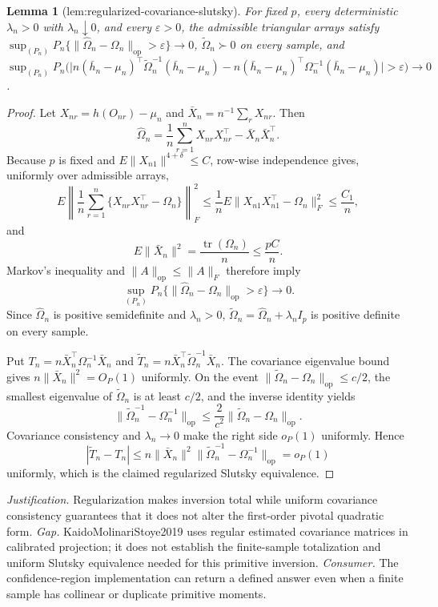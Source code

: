 \documentclass{article}
\newtheorem{lemma}{Lemma}
\begin{document}
\begin{lemma}[lem:regularized-covariance-slutsky]\label{lem:regularized-covariance-slutsky}
For fixed \(p\), every deterministic \(\lambda_n>0\) with \(\lambda_n\downarrow0\), and every \(\varepsilon>0\), the admissible triangular arrays satisfy \(\sup_{(P_n)}P_n\{\|\widehat\Omega_n-\Omega_n\|_{\mathrm{op}}>\varepsilon\}\to0\), \(\widetilde\Omega_n\succ0\) on every sample, and \(\sup_{(P_n)}P_n\bigl(\bigl|n(\bar h_n-\mu_n)^\top\widetilde\Omega_n^{-1}(\bar h_n-\mu_n)-n(\bar h_n-\mu_n)^\top\Omega_n^{-1}(\bar h_n-\mu_n)\bigr|>\varepsilon\bigr)\to0\).
\end{lemma}
\begin{proof}
Let \(X_{nr}=h(O_{nr})-\mu_n\) and \(\bar X_n=n^{-1}\sum_rX_{nr}\).  Then
\[
 \widehat\Omega_n=\frac1n\sum_{r=1}^nX_{nr}X_{nr}^\top-\bar X_n\bar X_n^\top.
\]
Because \(p\) is fixed and \(E\|X_{n1}\|^{4+\delta}\le C\), row-wise independence gives, uniformly over admissible arrays,
\[
 E\left\|\frac1n\sum_{r=1}^n
   \{X_{nr}X_{nr}^\top-\Omega_n\}\right\|_F^2
 \le \frac1n E\|X_{n1}X_{n1}^\top-\Omega_n\|_F^2
 \le\frac{C_1}{n},
\]
and
\[
 E\|\bar X_n\|^2=\frac{\operatorname{tr}(\Omega_n)}n\le\frac{pC}{n}.
\]
Markov's inequality and \(\|A\|_{\mathrm{op}}\le\|A\|_F\) therefore imply
\[
 \sup_{(P_n)}P_n\{\|\widehat\Omega_n-\Omega_n\|_{\mathrm{op}}>\varepsilon\}\longrightarrow0.
\]
Since \(\widehat\Omega_n\) is positive semidefinite and \(\lambda_n>0\), \(\widetilde\Omega_n=\widehat\Omega_n+\lambda_nI_p\) is positive definite on every sample.

Put \(T_n=n\bar X_n^\top\Omega_n^{-1}\bar X_n\) and \(\widetilde T_n=n\bar X_n^\top\widetilde\Omega_n^{-1}\bar X_n\).  The covariance eigenvalue bound gives \(n\|\bar X_n\|^2=O_P(1)\) uniformly.  On the event \(\|\widetilde\Omega_n-\Omega_n\|_{\mathrm{op}}\le c/2\), the smallest eigenvalue of \(\widetilde\Omega_n\) is at least \(c/2\), and the inverse identity yields
\[
 \|\widetilde\Omega_n^{-1}-\Omega_n^{-1}\|_{\mathrm{op}}
 \le \frac{2}{c^2}\|\widetilde\Omega_n-\Omega_n\|_{\mathrm{op}}.
\]
Covariance consistency and \(\lambda_n\to0\) make the right side \(o_P(1)\) uniformly.  Hence
\[
 |\widetilde T_n-T_n|
 \le n\|\bar X_n\|^2
 \|\widetilde\Omega_n^{-1}-\Omega_n^{-1}\|_{\mathrm{op}}
 =o_P(1)
\]
uniformly, which is the claimed regularized Slutsky equivalence.
\end{proof}
\par\smallskip\noindent \textit{Justification.} Regularization makes inversion total while uniform covariance consistency guarantees that it does not alter the first-order pivotal quadratic form. \textit{Gap.} KaidoMolinariStoye2019 uses regular estimated covariance matrices in calibrated projection; it does not establish the finite-sample totalization and uniform Slutsky equivalence needed for this primitive inversion. \textit{Consumer.} The confidence-region implementation can return a defined answer even when a finite sample has collinear or duplicate primitive moments.
\end{document}
